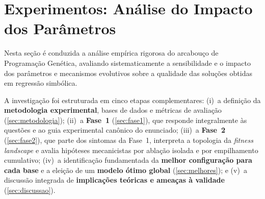 \section{Experimentos: Análise do Impacto dos Parâmetros}
\label{sec:experimentos}

Nesta seção é conduzida a análise empírica rigorosa do arcabouço de Programação
Genética, avaliando sistematicamente a sensibilidade e o impacto dos
parâmetros e mecanismos evolutivos sobre a qualidade das soluções obtidas em
regressão simbólica.

A investigação foi estruturada em cinco etapas complementares:
(i)~a definição da \textbf{metodologia experimental}, bases de dados e
métricas de avaliação (\cref{sec:metodologia});
(ii)~a \textbf{Fase~1} (\cref{sec:fase1}), que responde integralmente às
questões e ao guia experimental canônico do enunciado;
(iii)~a \textbf{Fase~2} (\cref{sec:fase2}), que parte dos sintomas da Fase~1,
interpreta a topologia da \emph{fitness landscape} e avalia hipóteses
mecanicistas por ablação isolada e por empilhamento cumulativo;
(iv)~a identificação fundamentada da \textbf{melhor configuração para cada base}
e a eleição de um \textbf{modelo ótimo global} (\cref{sec:melhores}); e
(v)~a discussão integrada de \textbf{implicações teóricas e ameaças à
validade} (\cref{sec:discussao}).






